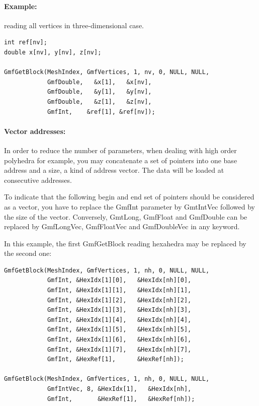 \documentclass[a4paper,12pt]{article}
\begin{document}
\clearpage
\paragraph{Example:} reading all vertices in three-dimensional case.

\begin{tt}
\begin{verbatim}
int ref[nv];
double x[nv], y[nv], z[nv];

GmfGetBlock(MeshIndex, GmfVertices, 1, nv, 0, NULL, NULL,
            GmfDouble,   &x[1],   &x[nv],
            GmfDouble,   &y[1],   &y[nv],
            GmfDouble,   &z[1],   &z[nv],
            GmfInt,    &ref[1], &ref[nv]);
\end{verbatim}
\end{tt}
\normalfont

\paragraph{Vector addresses:} In order to reduce the number of parameters, when dealing with high order polyhedra for example, you may concatenate a set of pointers into one base address and a size, a kind of address vector. The data will be loaded at consecutive addresses.

To indicate that the following begin and end set of pointers should be considered as a vector, you have to replace the GmfInt parameter by GmtIntVec followed by the size of the vector. Conversely, GmtLong, GmfFloat and GmfDouble can be replaced by GmfLongVec, GmfFloatVec and GmfDoubleVec in any keyword.

In this example, the first GmfGetBlock reading hexahedra may be replaced by the second one:

\begin{tt}
\begin{verbatim}
GmfGetBlock(MeshIndex, GmfVertices, 1, nh, 0, NULL, NULL,
            GmfInt, &HexIdx[1][0],   &HexIdx[nh][0],
            GmfInt, &HexIdx[1][1],   &HexIdx[nh][1],
            GmfInt, &HexIdx[1][2],   &HexIdx[nh][2],
            GmfInt, &HexIdx[1][3],   &HexIdx[nh][3],
            GmfInt, &HexIdx[1][4],   &HexIdx[nh][4],
            GmfInt, &HexIdx[1][5],   &HexIdx[nh][5],
            GmfInt, &HexIdx[1][6],   &HexIdx[nh][6],
            GmfInt, &HexIdx[1][7],   &HexIdx[nh][7],
            GmfInt, &HexRef[1],      &HexRef[nh]);

GmfGetBlock(MeshIndex, GmfVertices, 1, nh, 0, NULL, NULL,
            GmfIntVec, 8, &HexIdx[1],   &HexIdx[nh],
            GmfInt,       &HexRef[1],   &HexRef[nh]);

\end{verbatim}
\end{tt}
\normalfont
\end{document}
